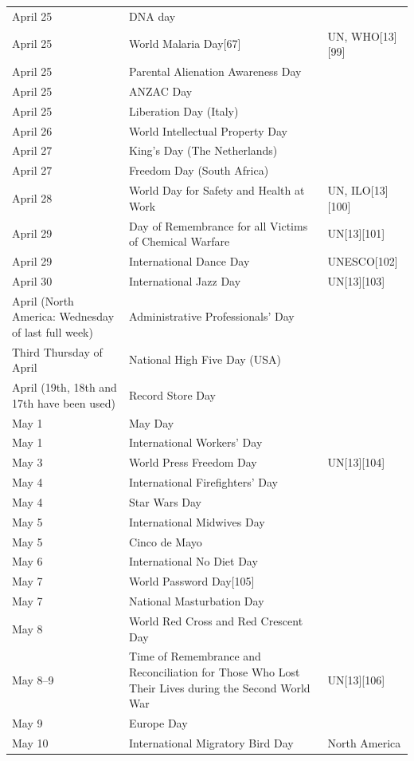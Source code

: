 \documentclass[
]{book}
\begin{document}
\begin{longtable}[t]{>{\raggedright\arraybackslash}p{8em}>{\raggedright\arraybackslash}p{20em}>{\raggedright\arraybackslash}p{12em}}
\addlinespace
April 25 & DNA day & \\
April 25 & World Malaria Day[67] & UN, WHO[13][99]\\
April 25 & Parental Alienation Awareness Day & \\
April 25 & ANZAC Day & \\
April 25 & Liberation Day (Italy) & \\
\addlinespace
April 26 & World Intellectual Property Day & \\
April 27 & King's Day (The Netherlands) & \\
April 27 & Freedom Day (South Africa) & \\
April 28 & World Day for Safety and Health at Work & UN, ILO[13][100]\\
April 29 & Day of Remembrance for all Victims of Chemical Warfare & UN[13][101]\\
\addlinespace
April 29 & International Dance Day & UNESCO[102]\\
April 30 & International Jazz Day & UN[13][103]\\
April (North America: Wednesday of last full week) & Administrative Professionals' Day & \\
Third Thursday of April & National High Five Day (USA) & \\
April (19th, 18th and 17th have been used) & Record Store Day & \\
\addlinespace
May 1 & May Day & \\
May 1 & International Workers' Day & \\
May 3 & World Press Freedom Day & UN[13][104]\\
May 4 & International Firefighters' Day & \\
May 4 & Star Wars Day & \\
\addlinespace
May 5 & International Midwives Day & \\
May 5 & Cinco de Mayo & \\
May 6 & International No Diet Day & \\
May 7 & World Password Day[105] & \\
May 7 & National Masturbation Day & \\
\addlinespace
May 8 & World Red Cross and Red Crescent Day & \\
May 8–9 & Time of Remembrance and Reconciliation for Those Who Lost Their Lives during the Second World War & UN[13][106]\\
May 9 & Europe Day & \\
May 10 & International Migratory Bird Day & North America\\

\end{longtable}
\end{document}
